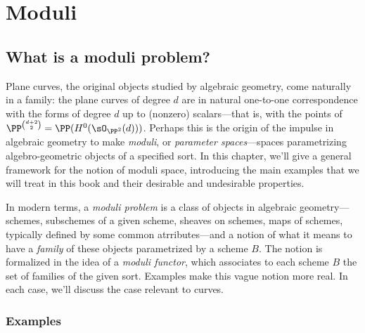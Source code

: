 

\chapter{Moduli} 
\label{Moduli chapter}\label{ModuliChapter}

\section{What is a moduli problem?}

Plane curves, the original objects studied by algebraic geometry, come naturally in a family: the plane curves of degree $d$
are in natural one-to-one correspondence with the forms of degree $d$ up to (nonzero) scalars---that is, with the points
of 
$\PP^{\binom{d+2}{2}} = \PP(H^0(\sO_{\PP^2}(d)))$.
Perhaps this is the origin of the impulse in algebraic geometry to make 
 \emph{moduli}, or \emph{parameter spaces}---spaces parametrizing algebro-geometric objects of a specified sort. In this chapter, we'll give a general framework for the notion of moduli space, introducing the main examples that we will treat in this book and their desirable and undesirable properties.

In modern terms, a \emph{moduli problem} is a class of objects in algebraic geometry---schemes, subschemes of a given scheme, sheaves on schemes, maps of schemes, typically defined by some common atrributes---and a notion of what it means to have a \emph{family} of these objects parametrized by a scheme $B$. The notion is formalized in the idea of a \emph{moduli functor}, 
which associates to each scheme $B$ the set of families of the given sort. Examples make this vague notion more real. In each case, we'll discuss the case relevant to curves.

\subsection{Examples}

